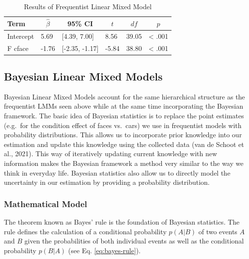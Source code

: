 \documentclass[
  doc,12pt,floatsintext]{apa7}
\begin{document}
\begin{table}[tbp]

\begin{center}
\begin{threeparttable}

\caption{\label{tab:fLMM-table}Results of Frequentist Linear Mixed Model}

\begin{tabular}{llllll}
\toprule
Term & \multicolumn{1}{c}{$\hat{\beta}$} & \multicolumn{1}{c}{95\% CI} & \multicolumn{1}{c}{$t$} & \multicolumn{1}{c}{$\mathit{df}$} & \multicolumn{1}{c}{$p$}\\
\midrule
Intercept & 5.69 & {}[4.39, 7.00] & 8.56 & 39.05 & < .001\\
F cface & -1.76 & {}[-2.35, -1.17] & -5.84 & 38.80 & < .001\\
\bottomrule
\end{tabular}

\end{threeparttable}
\end{center}

\end{table}

\subsection{Bayesian Linear Mixed Models}\label{bayesian-linear-mixed-models}

Bayesian Linear Mixed Models account for the same hierarchical structure as the frequentist LMMs seen above while at the same time incorporating the Bayesian framework. The basic idea of Bayesian statistics is to replace the point estimates (e.g.~for the condition effect of faces vs.~cars) we use in frequentist models with probability distributions. This allows us to incorporate prior knowledge into our estimation and update this knowledge using the collected data (van de Schoot et al., 2021). This way of iteratively updating current knowledge with new information makes the Bayesian framework a method very similar to the way we think in everyday life. Bayesian statistics also allow us to directly model the uncertainty in our estimation by providing a probability distribution.

\subsubsection{Mathematical Model}\label{mathematical-model}

The theorem known as Bayes' rule is the foundation of Bayesian statistics. The rule defines the calculation of a conditional probability \(p(A|B)\) of two events \(A\) and \(B\) given the probabilities of both individual events as well as the conditional probability \(p(B|A)\) (see Eq. \eqref{eq:bayes-rule}).
\end{document}
